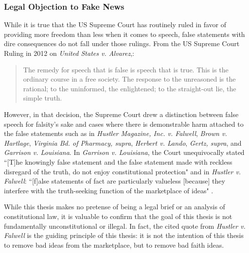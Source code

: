 \documentclass[preprint,review,12pt]{elsarticle}
\begin{document}
\subsubsection{Legal Objection to Fake News}
While it is true that the US Supreme Court has routinely ruled in favor of providing more freedom than less when it comes to speech, false statements with dire consequences do not fall under those rulings. From the US Supreme Court Ruling in 2012 on \textit{United States v. Alvarez},: 
\begin{quote}The remedy for speech that is false is speech that is true. This is the ordinary course in a free society. The response to the unreasoned is the rational; to the uninformed, the enlightened; to the straight-out lie, the simple truth.\cite{scotus2012alvarez}\end{quote} 
However, in that decision, the Supreme Court drew a distinction between false speech for falsity's sake and cases where there is demonstrable harm attached to the false statements such as in \textit{Hustler Magazine, Inc. v. Falwell}, \textit{Brown v. Hartlage}, \textit{Virginia Bd. of Pharmacy, supra}, \textit{Herbert v. Lando}, \textit{Gertz, supra}, and \textit{Garrison v. Louisiana}. 
In \textit{Garrison v. Louisiana}, the Court unequivocally stated ``[T]he knowingly false statement and the false statement made with reckless disregard of the truth, do not enjoy constitutional protection" \cite{scotus1964garrison} and in \textit{Hustler v. Falwell}: ``[f]alse statements of fact are particularly valueless [because] they interfere with the truth-seeking function of the marketplace of ideas" \cite{scotus1987hustler}. 

While this thesis makes no pretense of being a legal brief or an analysis of constitutional law, it is valuable to confirm that the goal of this thesis is not fundamentally unconstitutional or illegal. In fact, the cited quote from \textit{Hustler v. Falwell} is the guiding principle of this thesis: it is not the intention of this thesis to remove bad ideas from the marketplace, but to remove bad faith ideas.
\end{document}

